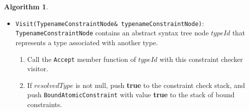 \documentclass[a4paper,oneside,11pt]{book}
\theoremstyle{definition}
\newtheorem{algo}{Algorithm}[section]
\begin{document}
\begin{algo}
\begin{itemize}
\begin{enumerate}
\begin{enumerate}
For $i$ = 1, \ldots, $n$:
\begin{enumerate}
\item
Let $t$ be a $i$'th type expression of the multiParamConstraintNode.
\item
Call the \verb|Accept| member function of $t$ with this constraint checker visitor.
\item
If $resolvedType$ is not null, add $resolvedType $ to $a$.
\item
Otherwise report error.
\end{enumerate}
\item
Compute a 16-byte $conceptId$ using algorithm \ref{computeconceptid} for the concept symbol $s$ and list of type arguments $a$.
\item
Lookup $conceptId$ from the concept repository (section \ref{conceptrepository}).
\item
If found, push \textbf{true} to the constraint check stack,
push a bound constraint cloned from the bound constraint contained by the instantiated concept, and return.
\item
Otherwise, instantiate concept $s$ with type arguments $a$ using algorithm \ref{instantiateconcept}.
Let $c$ be the instantiated concept.
\item
If $c$ is not null, add $c$ to the concept repository with id $conceptId$, and push \textbf{true} to the constraint check stack,
and push bound constraint corresponding to $c$ to the stack of bound constraints.
\item
Otherwise, push \textbf{false} to the constraint check stack and push \verb|BoundAtomicConstraint|
with value \textbf{false} to the stack of bound constraints.
\end{enumerate}
\item
Otherwise report error.
\end{enumerate}
\item
\verb|Visit(TypenameConstraintNode& typenameConstraintNode)|:\\
\verb|TypenameConstraintNode| contains an abstract syntax tree node $typeId$ that represents a type associated with another type.
\begin{enumerate}
\item
Call the \verb|Accept| member function of $typeId$ with this constraint checker visitor.
\item
If $resolvedType$ is not null, push \textbf{true} to the constraint check stack, and
push \verb|BoundAtomicConstraint| with value \textbf{true} to the stack of bound constraints.

\end{enumerate}
\end{itemize}
\end{algo}
\end{document}
